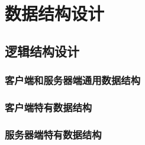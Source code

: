 \chapter{数据结构设计}
    \section{逻辑结构设计}
        \subsection{客户端和服务器端通用数据结构}
        \subsection{客户端特有数据结构}

        \subsection{服务器端特有数据结构}
